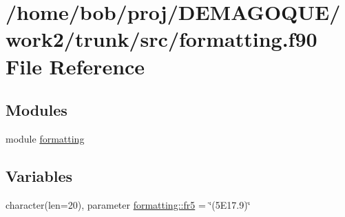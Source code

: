 \hypertarget{formatting_8f90}{
\section{/home/bob/proj/DEMAGOQUE/work2/trunk/src/formatting.f90 File Reference}
\label{formatting_8f90}
}
\subsection*{Modules}
\begin{DoxyCompactItemize}
\item 
module \hyperlink{namespaceformatting}{formatting}
\end{DoxyCompactItemize}
\subsection*{Variables}
\begin{DoxyCompactItemize}
\item 
character(len=20), parameter \hyperlink{namespaceformatting_a552aa51d2fb15a338e371114fd02c6e1}{formatting::fr5} = \char`\"{}(5E17.9)\char`\"{}
\end{DoxyCompactItemize}
